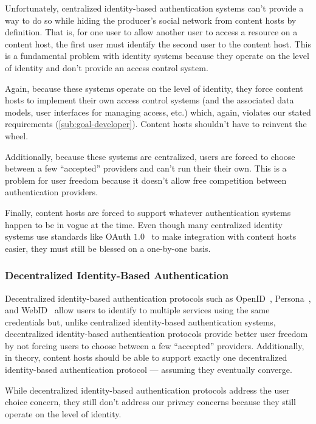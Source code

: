\documentclass[pdftex,12pt,a4papaer,twoside,notitlepage]{report}
\begin{document}
Unfortunately, centralized identity-based authentication systems can't provide a
way to do so while hiding the producer's social network from content hosts by
definition. That is, for one user to allow another user to access a resource on
a content host, the first user must identify the second user to the content
host. This is a fundamental problem with identity systems because they operate
on the level of identity and don't provide an access control system.

Again, because these systems operate on the level of identity, they force
content hosts to implement their own access control systems (and the associated
data models, user interfaces for managing access, etc.) which, again, violates
our stated requirements (\cref{sub:goal-developer}). Content hosts
shouldn't have to reinvent the wheel.

Additionally, because these systems are centralized, users are forced to choose
between a few ``accepted'' providers and can't run their their own. This is a
problem for user freedom because it doesn't allow free competition between
authentication providers.

Finally, content hosts are forced to support whatever authentication systems
happen to be in vogue at the time. Even though many centralized identity systems
use standards like OAuth $1.0$~\cite{oauth} to make integration with content
hosts easier, they must still be blessed on a one-by-one basis.

\subsubsection{Decentralized Identity-Based Authentication}

Decentralized identity-based authentication protocols such as
OpenID~\cite{openid}, Persona~\cite{persona}, and WebID~\cite{webid} allow users
to identify to multiple services using the same credentials but, unlike
centralized identity-based authentication systems, decentralized identity-based
authentication protocols provide better user freedom by not forcing users to
choose between a few ``accepted'' providers. Additionally, in theory, content
hosts should be able to support exactly one decentralized identity-based
authentication protocol --- assuming they eventually converge.

While decentralized identity-based authentication protocols address the user
choice concern, they still don't address our privacy concerns because they still
operate on the level of identity.
\end{document}
